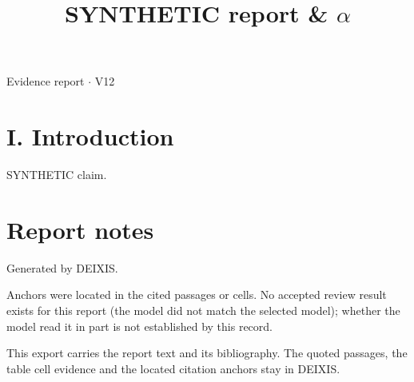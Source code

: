\documentclass[journal]{IEEEtran}
\begin{document}
\title{SYNTHETIC report \& \ensuremath{\alpha}}

\maketitle

\noindent Evidence report \ensuremath{\cdot} V12

\section*{I. Introduction}

SYNTHETIC claim. \cite{Synth26}

\section*{Report notes}

Generated by DEIXIS.

Anchors were located in the cited passages or cells. No accepted review result exists for this report (the model did not match the selected model); whether the model read it in part is not established by this record.

This export carries the report text and its bibliography. The quoted passages, the table cell evidence and the located citation anchors stay in DEIXIS.




\end{document}
